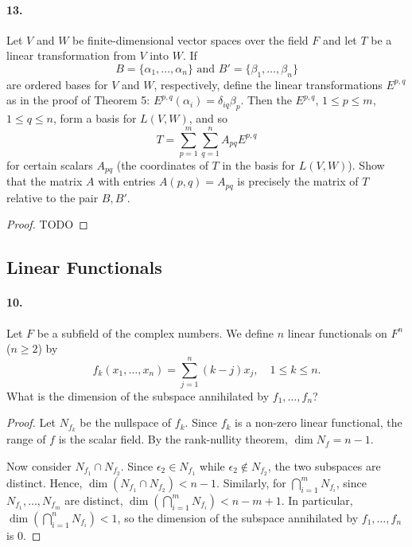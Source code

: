 \documentclass{article}
\begin{document}
\paragraph{13.} Let $V$ and $W$ be finite-dimensional vector spaces over the
field $F$ and let $T$ be a linear transformation from $V$ into $W$. If \[
  B = \{\alpha_1, \ldots, \alpha_n\} \text{ and }
  B' = \{\beta_1, \ldots, \beta_n\}
\] are ordered bases for $V$ and $W$, respectively, define the linear
transformations $E^{p,q}$ as in the proof of Theorem 5: $E^{p,q}(\alpha_i) =
\delta_{iq}\beta_p$. Then the $E^{p,q}$, $1 \leq p \leq m$, $1 \leq q \leq n$,
form a basis for $L(V, W)$, and so \[
  T = \sum_{p=1}^m \sum_{q=1}^n A_{pq}E^{p,q}
\] for certain scalars $A_{pq}$ (the coordinates of $T$ in the basis for $L(V,
W)$). Show that the matrix $A$ with entries $A(p, q) = A_{pq}$ is precisely the
matrix of $T$ relative to the pair $B, B'$.

\begin{proof}
  TODO
\end{proof}

\subsection{Linear Functionals}

\paragraph{10.} Let $F$ be a subfield of the complex numbers. We define $n$
linear functionals on $F^n$ ($n \geq 2$) by \[
  f_k(x_1, \ldots, x_n) = \sum_{j=1}^n (k - j)x_j,\quad
  1 \leq k \leq n.
\] What is the dimension of the subspace annihilated by $f_1, \ldots, f_n$?

\begin{proof}
  Let $N_{f_k}$ be the nullspace of $f_k$. Since $f_k$ is a non-zero linear
  functional, the range of $f$ is the scalar field. By the rank-nullity theorem,
  $\dim N_f = n - 1$.

  Now consider $N_{f_1} \cap N_{f_2}$. Since $\epsilon_2 \in N_{f_1}$ while
  $\epsilon_2 \not\in N_{f_2}$, the two subspaces are distinct. Hence,
  $\dim(N_{f_1} \cap N_{f_2}) < n - 1$. Similarly, for
  $\bigcap_{i=1}^m N_{f_i}$, since $N_{f_1}, \ldots, N_{f_m}$ are distinct,
  $\dim(\bigcap_{i=1}^m N_{f_i}) < n - m + 1$. In particular,
  $\dim(\bigcap_{i=1}^n N_{f_i}) < 1$, so the dimension of the subspace
  annihilated by $f_1, \ldots, f_n$ is 0.
\end{proof}
\end{document}

